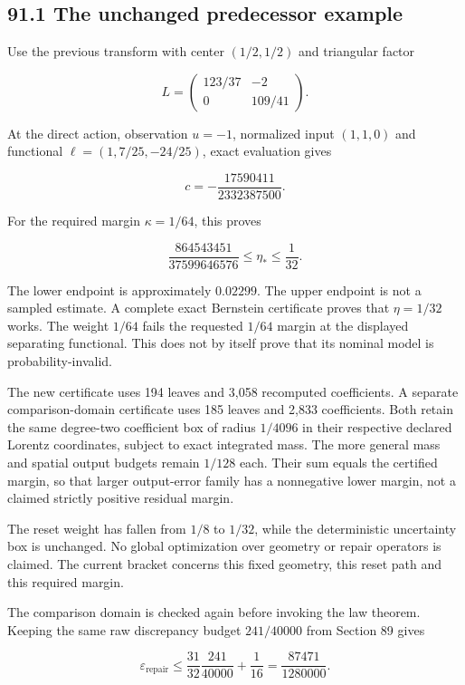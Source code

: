 \documentclass[11pt,letterpaper]{article}
\begin{document}
\subsection{91.1 The unchanged predecessor
example}\label{the-unchanged-predecessor-example}

Use the previous transform with center \((1/2,1/2)\) and triangular
factor

\[
L=\begin{pmatrix}123/37&-2\\0&109/41\end{pmatrix}.
\]

At the direct action, observation \(u=-1\), normalized input \((1,1,0)\)
and functional \(\ell=(1,7/25,-24/25)\), exact evaluation gives

\[
c=-\frac{17590411}{2332387500}.
\]

For the required margin \(\kappa=1/64\), this proves

\[
\frac{864543451}{37599646576}
\leq\eta_*\leq\frac1{32}.
\]

The lower endpoint is approximately \(0.02299\). The upper endpoint is
not a sampled estimate. A complete exact Bernstein certificate proves
that \(\eta=1/32\) works. The weight \(1/64\) fails the requested
\(1/64\) margin at the displayed separating functional. This does not by
itself prove that its nominal model is probability-invalid.

The new certificate uses 194 leaves and 3,058 recomputed coefficients. A
separate comparison-domain certificate uses 185 leaves and 2,833
coefficients. Both retain the same degree-two coefficient box of radius
\(1/4096\) in their respective declared Lorentz coordinates, subject to
exact integrated mass. The more general mass and spatial output budgets
remain \(1/128\) each. Their sum equals the certified margin, so that
larger output-error family has a nonnegative lower margin, not a claimed
strictly positive residual margin.

The reset weight has fallen from \(1/8\) to \(1/32\), while the
deterministic uncertainty box is unchanged. No global optimization over
geometry or repair operators is claimed. The current bracket concerns
this fixed geometry, this reset path and this required margin.

The comparison domain is checked again before invoking the law theorem.
Keeping the same raw discrepancy budget \(241/40000\) from Section 89
gives

\[
\varepsilon_{\mathrm{repair}}
\leq\frac{31}{32}\frac{241}{40000}+\frac1{16}
=\frac{87471}{1280000}.
\]
\end{document}

